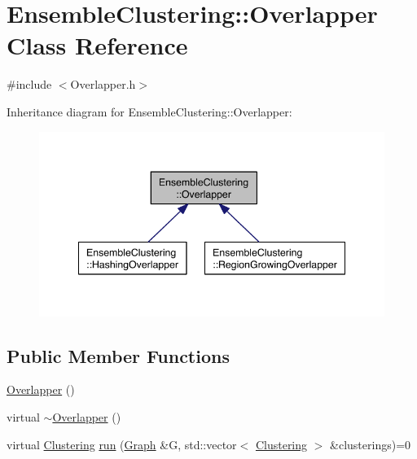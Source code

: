 \hypertarget{class_ensemble_clustering_1_1_overlapper}{\section{Ensemble\-Clustering\-:\-:Overlapper Class Reference}
\label{class_ensemble_clustering_1_1_overlapper}
}


{\ttfamily \#include $<$Overlapper.\-h$>$}



Inheritance diagram for Ensemble\-Clustering\-:\-:Overlapper\-:
\nopagebreak
\begin{figure}[H]
\begin{center}
\leavevmode
\includegraphics[width=344pt]{class_ensemble_clustering_1_1_overlapper__inherit__graph}
\end{center}
\end{figure}
\subsection*{Public Member Functions}
\begin{DoxyCompactItemize}
\item 
\hyperlink{class_ensemble_clustering_1_1_overlapper_ac6dbb69f2ca3a9caccd49e32919594fd}{Overlapper} ()
\item 
virtual \hyperlink{class_ensemble_clustering_1_1_overlapper_a58ec179d9470f32a90279f3e8b273874}{$\sim$\-Overlapper} ()
\item 
virtual \hyperlink{class_ensemble_clustering_1_1_clustering}{Clustering} \hyperlink{class_ensemble_clustering_1_1_overlapper_a427ef1bf113f2c59e26e3e3f7c3d266b}{run} (\hyperlink{class_ensemble_clustering_1_1_graph}{Graph} \&G, std\-::vector$<$ \hyperlink{class_ensemble_clustering_1_1_clustering}{Clustering} $>$ \&clusterings)=0
\end{DoxyCompactItemize}


